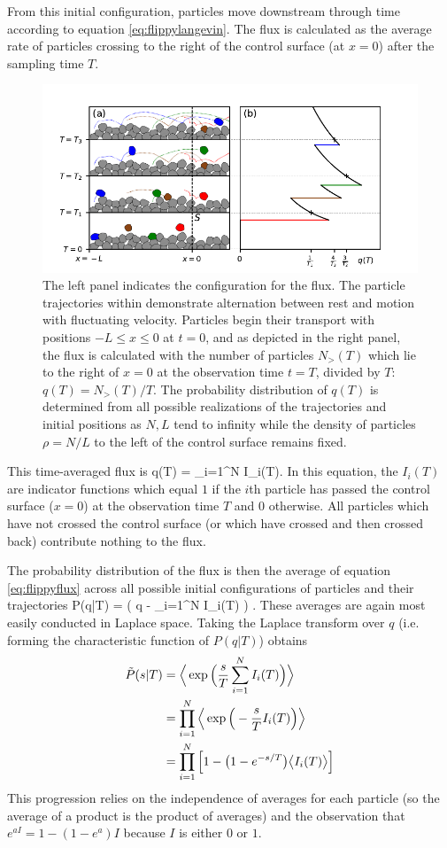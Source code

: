 From this initial configuration, particles move downstream through time according to equation \ref{eq:flippylangevin}.
The flux is calculated as the average rate of particles crossing to the right of the control surface (at $x=0$) after the sampling time $T$.
\begin{figure}
	\centerline{\includegraphics{./figures/ch2/figure1.pdf}}
	\caption{The left panel indicates the configuration for the flux. The particle trajectories within demonstrate alternation between rest and motion with fluctuating velocity. Particles begin their transport with positions $-L\leq x \leq 0$ at $t=0$, and as depicted in the right panel, the flux is calculated with the number of particles $N_>(T)$ which lie to the right of $x=0$ at the observation time $t=T$, divided by $T$: $q(T) = N_>(T)/T$. The probability distribution of $q(T)$ is determined from all possible realizations of the trajectories and initial positions as $N,L$ tend to infinity while the density of particles $\rho=N/L$ to the left of the control surface remains fixed.}
	\label{fig:flipflopfig1}
\end{figure}
This time-averaged flux is
\be q(T) = \sum_{i=1}^N I_i(T). \label{eq:flippyflux} \ee
In this equation, the $I_i(T)$ are indicator functions which equal $1$ if the $i$th particle has passed the control surface ($x=0$) at the observation time $T$ and $0$ otherwise.
All particles which have not crossed the control surface (or which have crossed and then crossed back) contribute nothing to the flux.

The probability distribution of the flux is then the average of equation \ref{eq:flippyflux} across all possible initial configurations of particles and their trajectories
\be P(q|T) = \Big \bra \delta\Big( q - \sum_{i=1}^N I_i(T) \Big) \Big\ket. \ee
These averages are again most easily conducted in Laplace space. 
Taking the Laplace transform over $q$ (i.e. forming the characteristic function of $P(q|T)$) obtains
\begin{align} \tilde{P}(s|T) &=  \Big\langle \exp\Big(\frac{s}{T}\sum_{i=1}^N I_i(T)\Big)\Big\rangle \\
	&=  \prod_{i=1}^N \Big\langle \exp\Big(-\frac{s}{T}I_i(T)\Big)\Big\rangle \\
	&= \prod_{i=1}^N \Big[1-\big(1-e^{-s/T}\big)\big\langle I_i(T) \big\rangle \Big] \label{eq:flippycharacteristic}\end{align}
This progression relies on the independence of averages for each particle (so the average of a product is the product of averages) and the observation that  $e^{a I} = 1-(1-e^a)I$ because $I$ is either $0$ or $1$.

